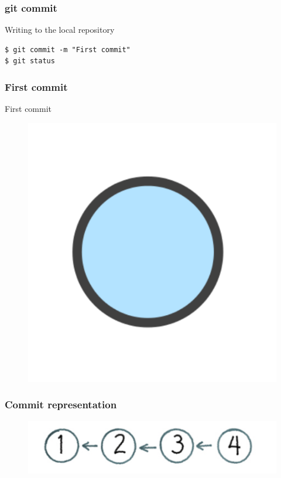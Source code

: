 \documentclass{beamer}
\begin{document}
\begin{frame}[fragile]
\frametitle{git commit}

Writing to the local repository

\begin{lstlisting}
$ git commit -m "First commit"
$ git status
\end{lstlisting}
\end{frame}


\begin{frame}
\frametitle{First commit}
First commit
\begin{figure}
\includegraphics[scale=0.4]{figures/f8.png}
\end{figure}

\end{frame}


\begin{frame}
\frametitle{Commit representation}

\begin{figure}
\includegraphics[scale=0.3]{figures/f9.png}
\end{figure}

\end{frame}
\end{document}
